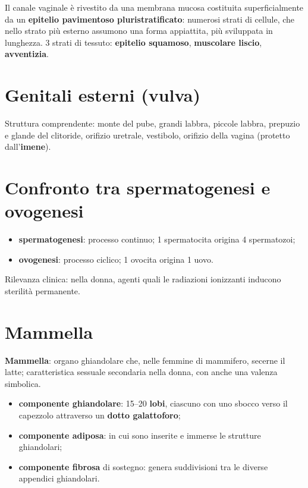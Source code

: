 Il canale vaginale è rivestito da una membrana mucosa costituita superficialmente da un
\textbf{epitelio pavimentoso pluristratificato}: numerosi strati di cellule, che nello strato più
esterno assumono una forma appiattita, più sviluppata in lunghezza. 3 strati di tessuto:
\textbf{epitelio squamoso}, \textbf{muscolare liscio}, \textbf{avventizia}.

\section{Genitali esterni (vulva)}

Struttura comprendente: monte del pube, grandi labbra, piccole labbra, prepuzio e glande del
clitoride, orifizio uretrale, vestibolo, orifizio della vagina (protetto dall'\textbf{imene}).

\section{Confronto tra spermatogenesi e ovogenesi}

\begin{itemize}
  \item \textbf{spermatogenesi}: processo continuo; 1 spermatocita origina 4 spermatozoi;
  \item \textbf{ovogenesi}: processo ciclico; 1 ovocita origina 1 uovo.
\end{itemize}
Rilevanza clinica: nella donna, agenti quali le radiazioni ionizzanti inducono sterilità
permanente.

\section{Mammella}

\textbf{Mammella}: organo ghiandolare che, nelle femmine di mammifero, secerne il latte;
caratteristica sessuale secondaria nella donna, con anche una valenza simbolica.

\begin{itemize}
  \item \textbf{componente ghiandolare}: 15--20 \textbf{lobi}, ciascuno con uno sbocco verso il
    capezzolo attraverso un \textbf{dotto galattoforo};
  \item \textbf{componente adiposa}: in cui sono inserite e immerse le strutture ghiandolari;
  \item \textbf{componente fibrosa} di sostegno: genera suddivisioni tra le diverse appendici
    ghiandolari.
\end{itemize}

